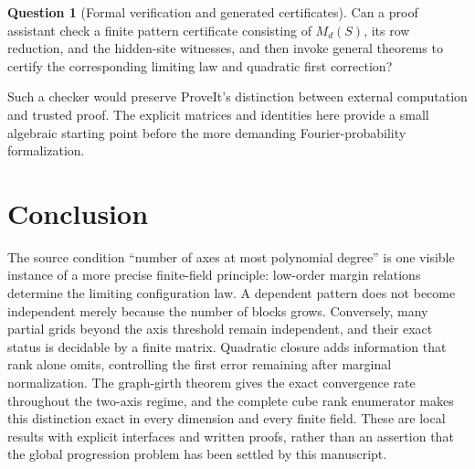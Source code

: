 \documentclass[11pt,a4paper]{article}
\numberwithin{equation}{section}
\theoremstyle{definition}
\newtheorem{question}[theorem]{Question}
\theoremstyle{remark}
\newcommand{\1}{\mathbf 1}
\begin{document}
\begin{question}[Formal verification and generated certificates]
Can a proof assistant check a finite pattern certificate consisting of
$M_d(S)$, its row reduction, and the hidden-site witnesses, and then invoke
general theorems to certify the corresponding limiting law and quadratic
first correction?
\end{question}
Such a checker would preserve ProveIt's distinction between external
computation and trusted proof. The explicit matrices and identities here
provide a small algebraic starting point before the more demanding
Fourier-probability formalization.

\section*{Conclusion}
The source condition ``number of axes at most polynomial degree'' is one
visible instance of a more precise finite-field principle: low-order
margin relations determine the limiting configuration law. A dependent
pattern does not become independent merely because the number of blocks
grows. Conversely, many partial grids beyond the axis threshold remain
independent, and their exact status is decidable by a finite matrix.
Quadratic closure adds information that rank alone omits, controlling the
first error remaining after marginal normalization. The graph-girth theorem gives the exact convergence rate throughout the
two-axis regime, and the complete cube
rank enumerator makes this distinction exact in every dimension and
every finite field. These are local results with explicit interfaces and
written proofs, rather than an assertion that the global progression
problem has been settled by this manuscript.
\end{document}
